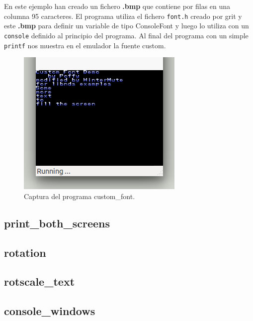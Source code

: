 \documentclass[12pt,english]{article}
\begin{document}
    En este ejemplo han creado un fichero \textbf{.bmp} que contiene por filas en una columna 95 caracteres. El programa utiliza el fichero \texttt{font.h} creado por grit y este \textbf{.bmp} para definir un variable de tipo ConsoleFont y luego lo utiliza con un \texttt{console} definido al principio del programa. Al final del programa con un simple \texttt{printf} nos muestra en el emulador la fuente custom.

    \begin{figure}[H] 
    \centering
    \includegraphics[scale=0.5]{images/custom_font}
    \caption{Captura del programa custom\_font.}
    \end{figure}

    \subsection{print\_both\_screens}

    \subsection{rotation}

    \subsection{rotscale\_text}

    \subsection{console\_windows}
      
    
    
\end{document}
